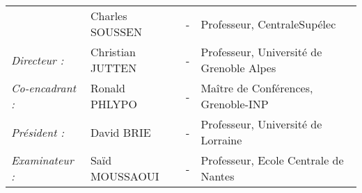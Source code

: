 \begin{titlepage}
\begin{center}
\begin{tabular}{llcl}
                				& Charles SOUSSEN		& - & Professeur, CentraleSupélec\\ %
      \textit{Directeur :}	        & Christian JUTTEN		& - & Professeur, Université de Grenoble Alpes\\ %
      \textit{Co-encadrant :}	        & Ronald PHLYPO		& - & Maître de Conférences, Grenoble-INP\\ %
      \textit{Président :}	        & David BRIE		& - & Professeur, Université de Lorraine\\ %
      \textit{Examinateur :}        & Saïd MOUSSAOUI                & - & Professeur, Ecole Centrale de Nantes\\ %
\end{tabular}
\end{center}
\end{titlepage}
\sloppy

\titlepage

